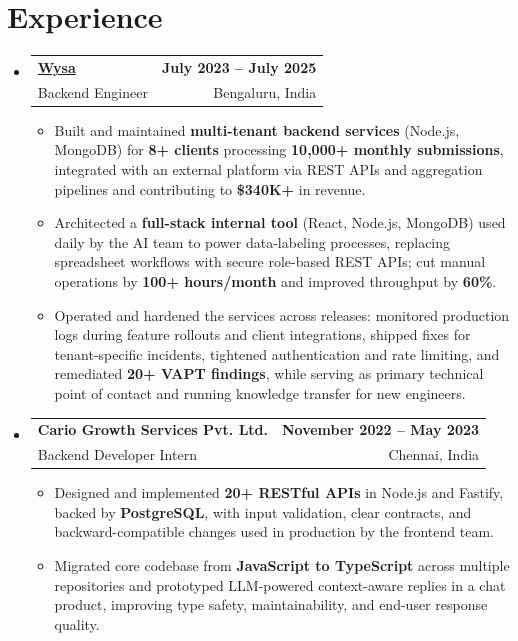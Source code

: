 \documentclass[letterpaper,10pt]{article}
\makeatletter
\newcommand{\resumeItem}[1]{
  \item\small{#1\vspace{-1pt}}
}
\newcommand{\resumeSubheading}[4]{
  \vspace{1pt}\item
    \begin{tabular*}{0.985\textwidth}[t]{l@{\extracolsep{\fill}}r}
      \textbf{#1} & \textbf{\small #2} \\
      {\small\color{ResumeSlate} #3} & {\small\color{ResumeSlate} #4} \\
    \end{tabular*}\vspace{-6pt}
}
\newcommand{\resumeSubHeadingListStart}{\begin{itemize}[leftmargin=0.0in, label={}, itemsep=2pt, topsep=2pt]}
\newcommand{\resumeSubHeadingListEnd}{\end{itemize}}
\newcommand{\resumeItemListStart}{\begin{itemize}[leftmargin=0.18in, itemsep=2pt, topsep=1pt]}
\newcommand{\resumeItemListEnd}{\end{itemize}\vspace{-4pt}}
\makeatother
\begin{document}
\section{Experience}
\resumeSubHeadingListStart
  \resumeSubheading
    {\href{https://www.wysa.io}{Wysa}}{July 2023 -- July 2025}
    {Backend Engineer}{Bengaluru, India}
    \resumeItemListStart
      \resumeItem{Built and maintained \textbf{multi-tenant backend services} (Node.js, MongoDB) for \textbf{8+ clients} processing \textbf{10{,}000+ monthly submissions}, integrated with an external platform via REST APIs and aggregation pipelines and contributing to \textbf{\$340K+} in revenue.}
      \resumeItem{Architected a \textbf{full-stack internal tool} (React, Node.js, MongoDB) used daily by the AI team to power data-labeling processes, replacing spreadsheet workflows with secure role-based REST APIs; cut manual operations by \textbf{100+ hours/month} and improved throughput by \textbf{60\%}.}
      \resumeItem{Operated and hardened the services across releases: monitored production logs during feature rollouts and client integrations, shipped fixes for tenant-specific incidents, tightened authentication and rate limiting, and remediated \textbf{20+ VAPT findings}, while serving as primary technical point of contact and running knowledge transfer for new engineers.}
    \resumeItemListEnd
  \resumeSubheading
    {Cario Growth Services Pvt. Ltd.}{November 2022 -- May 2023}
    {Backend Developer Intern}{Chennai, India}
    \resumeItemListStart
      \resumeItem{Designed and implemented \textbf{20+ RESTful APIs} in Node.js and Fastify, backed by \textbf{PostgreSQL}, with input validation, clear contracts, and backward-compatible changes used in production by the frontend team.}
      \resumeItem{Migrated core codebase from \textbf{JavaScript to TypeScript} across multiple repositories and prototyped LLM-powered context-aware replies in a chat product, improving type safety, maintainability, and end-user response quality.}
    \resumeItemListEnd
\resumeSubHeadingListEnd
\vspace{-4pt}
\end{document}
